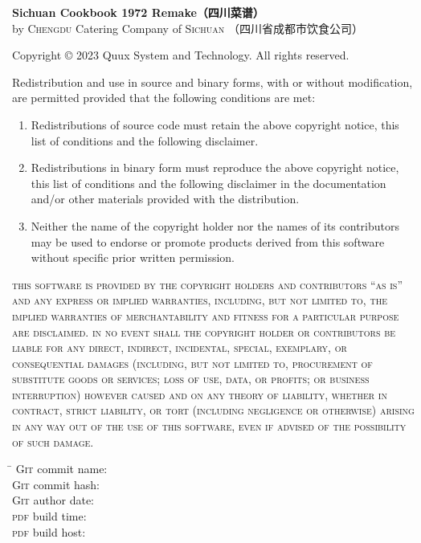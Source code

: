 \begingroup%
\footnotesize%
\singlespacing%
\setlength{\parindent}{0pt}%
\setlength{\parskip}{.166666\baselineskip}%
{\sffamily\bfseries Sichuan Cookbook 1972 Remake\!（四川菜谱）}\\
by \textsc{Chengdu} Catering Company of \textsc{Sichuan}\!%
（四川省成都市饮食公司）

\null

Copyright {\copyright} 2023 Quux System and Technology. All rights reserved.

Redistribution and use in source and binary forms, with or without
modification, are permitted provided that the following conditions are met:

\begin{enumerate}
\item Redistributions of source code must retain the above copyright notice,
      this list of conditions and the following disclaimer.

\item Redistributions in binary form must reproduce the above copyright notice,
      this list of conditions and the following disclaimer in the documentation
      and/or other materials provided with the distribution.

\item Neither the name of the copyright holder nor the names of its
      contributors may be used to endorse or promote products derived from
      this software without specific prior written permission.
\end{enumerate}

\textsc{this software is provided by the copyright holders and contributors
``as is'' and any express or implied warranties, including, but not limited to,
the implied warranties of merchantability and fitness for a particular purpose
are disclaimed. in no event shall the copyright holder or contributors be
liable for any direct, indirect, incidental, special, exemplary, or
consequential damages (including, but not limited to, procurement of
substitute goods or services; loss of use, data, or profits; or business
interruption) however caused and on any theory of liability, whether in
contract, strict liability, or tort (including negligence or otherwise)
arising in any way out of the use of this software, even if advised of the
possibility of such damage.}

\vfill

\setlength{\parskip}{.333333\baselineskip}%
\begin{tabbing}
\hspace{8.75em}\= \kill
\textsc{Git} commit name: \>\texttt{\gitcommitname}\\
\textsc{Git} commit hash: \>\texttt{\gitcommithash}\\
\textsc{Git} author date: \>\texttt{\gitauthordate}\\
\textsc{pdf} build time:  \>\texttt{\pdfbuildtime}\\
\textsc{pdf} build host:  \>\texttt{\pdfbuildhost}
\end{tabbing}
\vspace{-1\baselineskip}


